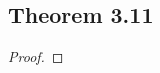 \documentclass[../../main.tex]{subfiles}
\begin{document}
\subsection{Theorem 3.11}
\begin{wts}

\end{wts}
\begin{proof}

\end{proof}
\end{document}
